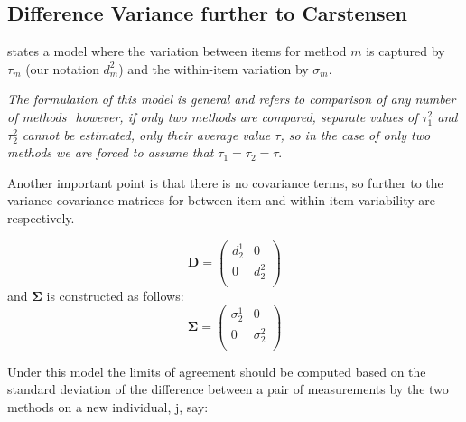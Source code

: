 \documentclass[12pt, a4paper]{report}
\theoremstyle{plain}
\theoremstyle{definition}
\theoremstyle{remark}
\begin{document}
	
	
	
	
	
	
	
	
	
	
	
	
	
	
	
	
	
	
	
	
	
	
	
	
	
	
	
	\subsection{Difference Variance further to Carstensen}
	
	\citet{BXC2008} states a model where the variation between items
	for method $m$ is captured by $\tau_m$ (our notation $d^2_m$) and the within-item
	variation by $\sigma_m$.
	
	\emph{The formulation of this model is general and refers to comparison
		of any number of methods  however, if only two methods are
		compared, separate values of $\tau^2_1$ and $\tau^2_2$ cannot be
		estimated, only their average value $\tau$, so in the case of only
		two methods we are forced to assume that $\tau_1 = \tau_2 = \tau$}\citep{BXC2008}.
	
	Another important point is that there is no covariance terms, so
	further to  \citet{BXC2008} the variance covariance matrices for
	between-item and within-item variability are respectively.
	
	\[\boldsymbol{D} = \left(
	\begin{array}{cc}
	d^1_2  & 0 \\
	0 & d^2_2 \\
	\end{array}
	\right) \]
	and  $\boldsymbol{\Sigma}$ is constructed as follows:
	\[\boldsymbol{\Sigma} = \left(
	\begin{array}{cc}
	\sigma^1_2  & 0 \\
	0 & \sigma^2_2 \\
	\end{array}
	\right) \]
	
	
	Under this model the limits of agreement should be computed based
	on the standard deviation of the difference between a pair of
	measurements by the two methods on a new individual, j, say:
	
\end{document}
